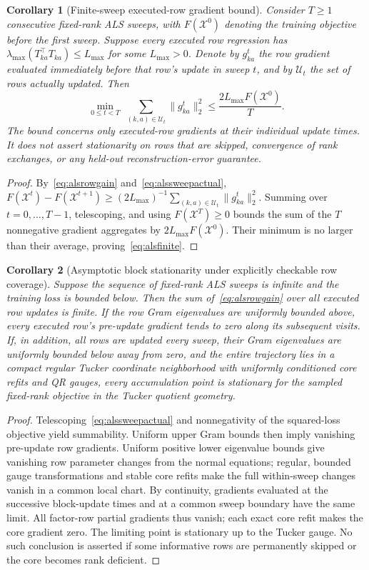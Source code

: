 \documentclass[review,10pt]{elsarticle}
\newtheorem{corollary}{Corollary}
\newcommand{\cX}{\mathcal X}
\begin{document}
\begin{corollary}[Finite-sweep executed-row gradient bound]\label{cor:alsfinite}
Consider $T\ge1$ consecutive fixed-rank ALS sweeps, with $F(\cX^0)$ denoting the training objective before the first sweep. Suppose every executed row regression has $\lambda_{\max}(T_{ka}^{\top}T_{ka})\le L_{\max}$ for some $L_{\max}>0$. Denote by $g_{ka}^{t}$ the row gradient evaluated immediately before that row's update in sweep $t$, and by $\mathcal U_t$ the set of rows actually updated. Then
\begin{equation}\label{eq:alsfinite}
\boxed{\min_{0\le t<T}\;\sum_{(k,a)\in\mathcal U_t}\|g_{ka}^{t}\|_2^2
\le\frac{2L_{\max}F(\cX^0)}{T}.}
\end{equation}
The bound concerns only executed-row gradients at their individual update times. It does not assert stationarity on rows that are skipped, convergence of rank exchanges, or any held-out reconstruction-error guarantee.
\end{corollary}
\begin{proof}
By~\eqref{eq:alsrowgain} and~\eqref{eq:alssweepactual},
$F(\cX^t)-F(\cX^{t+1})\ge(2L_{\max})^{-1}\sum_{(k,a)\in\mathcal U_t}\|g_{ka}^{t}\|_2^2$.
Summing over $t=0,\ldots,T-1$, telescoping, and using $F(\cX^T)\ge0$ bounds the sum of the $T$ nonnegative gradient aggregates by $2L_{\max}F(\cX^0)$. Their minimum is no larger than their average, proving~\eqref{eq:alsfinite}.
\end{proof}

\begin{corollary}[Asymptotic block stationarity under explicitly checkable row coverage]\label{cor:alsstat}
Suppose the sequence of fixed-rank ALS sweeps is infinite and the training loss is bounded below. Then the sum of~\eqref{eq:alsrowgain} over all executed row updates is finite. If the row Gram eigenvalues are uniformly bounded above, every executed row's \emph{pre-update gradient} tends to zero along its subsequent visits. If, in addition, all rows are updated every sweep, their Gram eigenvalues are uniformly bounded below away from zero, and the entire trajectory lies in a compact regular Tucker coordinate neighborhood with uniformly conditioned core refits and QR gauges, every accumulation point is stationary for the sampled fixed-rank objective in the Tucker quotient geometry.
\end{corollary}
\begin{proof}
Telescoping~\eqref{eq:alssweepactual} and nonnegativity of the squared-loss objective yield summability. Uniform upper Gram bounds then imply vanishing pre-update row gradients. Uniform positive lower eigenvalue bounds give vanishing row parameter changes from the normal equations; regular, bounded gauge transformations and stable core refits make the full within-sweep changes vanish in a common local chart. By continuity, gradients evaluated at the successive block-update times and at a common sweep boundary have the same limit. All factor-row partial gradients thus vanish; each exact core refit makes the core gradient zero. The limiting point is stationary up to the Tucker gauge. No such conclusion is asserted if some informative rows are permanently skipped or the core becomes rank deficient.
\end{proof}
\end{document}
